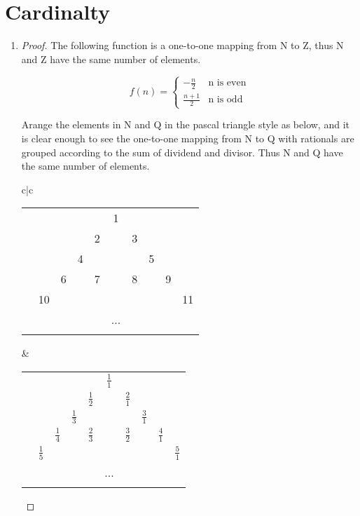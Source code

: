 \documentclass[paper=a4, fontsize=11pt]{scrartcl} %
\numberwithin{equation}{section} %
\numberwithin{figure}{section} %
\numberwithin{table}{section} %
\begin{document}
\section{Cardinalty}
\begin{enumerate}
	\item 
		\begin{proof}
			The following function is a one-to-one mapping from N to Z, thus N and Z have the same number of elements.
		
			\begin{equation}
			f(n) = 
				\begin{cases}
					-\frac{n}{2} & \text{n is even}\\
					\frac{n+1}{2} & \text{n is odd}
				\end{cases}
			\end{equation}
			
			Arange the elements in N and Q in the pascal triangle style as below, and it is clear enough to see the one-to-one mapping from N to Q with rationals are grouped according to the sum of dividend and divisor. Thus N and Q have the same number of elements.
			
			\begin{tabular}{c|c}
				\begin{tabular}{rccccccccc}
					&&&&&1\\\noalign{\smallskip\smallskip}
					&&&&2&&3\\\noalign{\smallskip\smallskip}
					&&&4&&&&5\\\noalign{\smallskip\smallskip}
					&&6&&7&&8&&9\\\noalign{\smallskip\smallskip}
					&10&&&&&&&&11\\\noalign{\smallskip\smallskip}
					&&&&&...\\\noalign{\smallskip\smallskip}
				\end{tabular} &
				\begin{tabular}{rccccccccc}
					&&&&&$\frac{1}{1}$ \\\noalign{\smallskip\smallskip}
					&&&&$\frac{1}{2}$&&$\frac{2}{1}$\\\noalign{\smallskip\smallskip}
					&&&$\frac{1}{3}$&&&&$\frac{3}{1}$\\\noalign{\smallskip\smallskip}
					&&$\frac{1}{4}$&&$\frac{2}{3}$&&$\frac{3}{2}$&&$\frac{4}{1}$\\\noalign{\smallskip\smallskip}
					&$\frac{1}{5}$&&&&&&&&$\frac{5}{1}$\\\noalign{\smallskip\smallskip}
					&&&&&...\\\noalign{\smallskip\smallskip}
				\end{tabular}
			\end{tabular}
			

\end{proof}
\end{enumerate}
\end{document}
